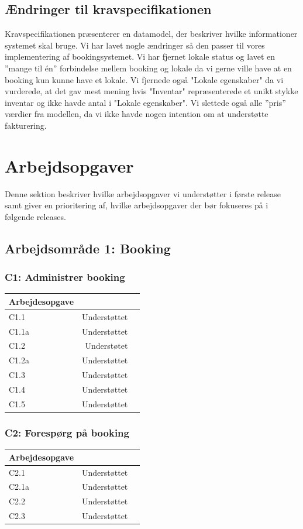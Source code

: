 \subsection{Ændringer til kravspecifikationen}
\label{Baggrund_kravspecifikationen_Aendringer}
Kravspecifikationen præsenterer en datamodel, der beskriver hvilke informationer systemet skal bruge. Vi har lavet nogle ændringer så den passer til vores implementering af bookingsystemet. Vi har fjernet lokale status og lavet en ”mange til én” forbindelse mellem booking og lokale da vi gerne ville have at en booking kun kunne have et lokale. Vi fjernede også "Lokale egenskaber" da vi vurderede, at det gav mest mening hvis "Inventar" repræsenterede et unikt stykke inventar og ikke havde antal i "Lokale egenskaber". Vi slettede også alle ”pris” værdier fra modellen, da vi ikke havde nogen intention om at understøtte fakturering.
\section{Arbejdsopgaver}
\label{Baggrund_Arb_opgaver}
Denne sektion beskriver hvilke arbejdsopgaver vi understøtter i første release samt giver en prioritering af, hvilke arbejdsopgaver der bør fokuseres på i følgende releases.
\subsection{Arbejdsområde 1: Booking}
\label{Baggrund_Arb_opgaver_Booking}
\subsubsection{C1: Administrer booking}
\begin{tabular}{ | l | r | p{} |}
	\hline
	Arbejdesopgave & \\ 
\hline
	C1.1 & Understøttet \\ 
\hline
	C1.1a & Understøttet \\ 
\hline
	C1.2 & Understøtet \\ 
\hline
	C1.2a & Understøttet \\ 
\hline
	C1.3 & Understøttet \\ 
\hline
	C1.4 & Understøttet \\ 
\hline
	C1.5 & Understøttet \\ 
\hline
\end{tabular}

\subsubsection{C2: Forespørg på booking}
\begin{tabular}{ | l | r | p{} |}
	\hline
	Arbejdesopgave & \\ 
\hline
	C2.1 & Understøttet \\ 
\hline
	C2.1a & Understøttet \\ 
\hline
	C2.2 & Understøttet \\ 
\hline
	C2.3 & Understøttet \\ 
\hline
\end{tabular}

